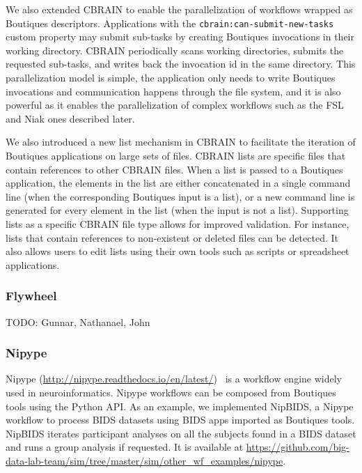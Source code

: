 \documentclass[a4paper,num-refs]{oup-contemporary}
\newcommand{\todo}[1]{\color{red}TODO: #1\color{black}}
\newcommand{\boutiques}{Boutiques\xspace}
\begin{document}
We also extended CBRAIN to enable the parallelization of workflows
wrapped as \boutiques descriptors. Applications with the
\texttt{cbrain:can-submit-new-tasks} custom property may submit sub-tasks by
creating \boutiques invocations in their working directory. CBRAIN
periodically scans working directories, submits the requested
sub-tasks, and writes back the invocation id in the same
directory. This parallelization model is simple, the application only
needs to write \boutiques invocations and communication happens
through the file system, and it is also powerful as it enables the
parallelization of complex workflows such as the FSL and Niak ones
described later. 

We also introduced a new list mechanism in CBRAIN to facilitate the
iteration of \boutiques applications on large sets of files. CBRAIN
lists are specific files that contain references to other CBRAIN
files. When a list is passed to a \boutiques application, the elements
in the list are either concatenated in a single command line (when the
corresponding \boutiques input is a list), or a new command line is
generated for every element in the list (when the input is not a
list). Supporting lists as a specific CBRAIN file type allows for
improved validation. For instance, lists that contain references to
non-existent or deleted files can be detected. It also allows users to
edit lists using their own tools such as scripts or spreadsheet
applications.

\subsubsection{Flywheel}
\todo{Gunnar, Nathanael, John}

\subsubsection{Nipype}
Nipype
(\url{http://nipype.readthedocs.io/en/latest/})~\cite{gorgolewski2011nipype}
is a workflow engine widely used in neuroinformatics. Nipype workflows
can be composed from \boutiques tools using the Python API. As an
example, we implemented NipBIDS, a Nipype workflow to process BIDS
datasets using BIDS apps imported as \boutiques tools. NipBIDS iterates
participant analyses on all the subjects found in a BIDS dataset and
runs a group analysis if requested. It is available at
\url{https://github.com/big-data-lab-team/sim/tree/master/sim/other_wf_examples/nipype}.
\end{document}
